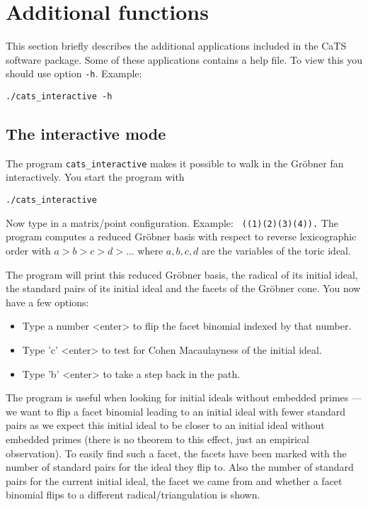 \section{Additional functions}
\label{applications}
This section briefly describes the additional applications included in
the CaTS software package. Some of these applications contains a help
file. To view this you should use option {\tt -h}. Example:
\begin{verbatim}
./cats_interactive -h
\end{verbatim}

\subsection{The interactive mode}
\label{cats_interactive}
The program {\tt cats\_interactive} makes it possible to walk in the
Gr\"obner fan interactively.  You start the program with
\begin{verbatim}
./cats_interactive
\end{verbatim}
Now type in a matrix/point configuration. Example: {\tt
  ((1)(2)(3)(4)).} The program computes a reduced Gr\"obner basis with
respect to reverse lexicographic order with $a>b>c>d> \ldots $ where
$a,b,c,d$ are the variables of the toric ideal.

The program will print this reduced Gr\"obner basis, the radical of
its initial ideal, the standard pairs of its initial ideal and the
facets of the Gr\"obner cone.  You now have a few options:
\begin{itemize}
\item Type a number <enter> to flip the facet binomial indexed by that
  number.
\item Type 'c' <enter> to test for Cohen Macaulayness of the initial ideal.
\item  Type 'b' <enter> to take a step back in the path.
\end{itemize}
The program is useful when looking for initial ideals without embedded
primes --- we want to flip a facet binomial leading to an initial
ideal with fewer standard pairs as we expect this initial ideal to be
closer to an initial ideal without embedded primes (there is no
theorem to this effect, just an empirical observation). To easily find
such a facet, the facets have been marked with the number of standard
pairs for the ideal they flip to. Also the number of standard pairs
for the current initial ideal, the facet we came from and whether a
facet binomial flips to a different radical/triangulation is shown.

